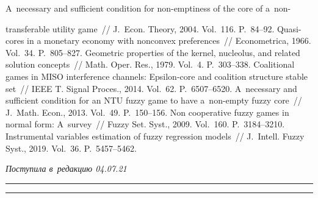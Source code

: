 \begin{multicols}{2}
{{\begin{thebibliography}{99}
       A~necessary and sufficient condition for  
non-emptiness of the core of a~non-\linebreak\vspace*{-12pt}

\pagebreak

\noindent
transferable utility game~// J.~Econ. Theory, 2004. 
Vol.~116. P.~84--92.
       Quasi-cores in a monetary economy with nonconvex 
preferences~// Econometrica, 1966. Vol.~34. P.~805--827.
       Geometric properties of the kernel, nucleolus, 
and related solution concepts~// Math.  Oper. Res., 1979. Vol.~4. P.~303--338.
       Coalitional games in MISO interference channels: 
Epsilon-core and coalition structure stable set~// IEEE T. Signal Proces., 2014. Vol.~62. 
P.~6507--6520.
       A~necessary and sufficient condition for an NTU fuzzy game to have 
a~non-empty fuzzy core~// J.~Math. Econ., 2013. Vol.~49. P.~150--156.
       Non cooperative fuzzy games in normal form: A~survey~// Fuzzy Set. 
Syst., 2009. Vol.~160. P.~3184--3210.
       Instrumental variables estimation of fuzzy regression models~// 
J.~Intell. Fuzzy Syst., 2019. Vol.~36. P.~5457--5462.

\end{thebibliography}

 }
 }

\end{multicols}

\vspace*{-9pt}

\hfill{\small\textit{Поступила в~редакцию 04.07.21}}

\vspace*{6pt}




\hrule

\vspace*{2pt}

\hrule

\vspace*{-4pt}

\def\tit{A CONDITION FOR NON-EMPTINESS OF~THE~EPSILON-CORE  
OF~A~NONTRANSFERABLE UTILITY FUZZY GAME AND~COMPUTATIONAL 
SCHEMES}


